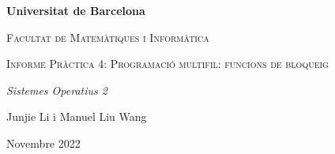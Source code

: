 \begin{titlepage}
\centering
    \vspace{1cm}
    {\bfseries\LARGE Universitat de Barcelona \par}
    \vspace{1cm}
    {\scshape\Large Facultat de Matemàtiques i Informàtica \par}
    \vspace{4cm}
    {\scshape\Huge Informe Pràctica 4: Programació multifil: funcions de bloqueig\par}
    \vspace{2cm}
    {\itshape\LARGE Sistemes Operatius 2 \par}
    \vfill
    {\Large Junjie Li i Manuel Liu Wang\par}
    \vfill
    {\Large Novembre 2022 \par}
\end{titlepage}



